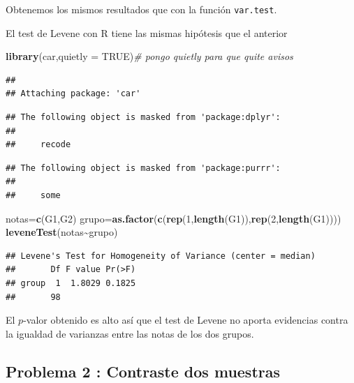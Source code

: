 \documentclass[
]{article}
\newenvironment{Shaded}{\begin{snugshade}}{\end{snugshade}}
\newcommand{\CommentTok}[1]{\textcolor[rgb]{0.56,0.35,0.01}{\textit{#1}}}
\newcommand{\DataTypeTok}[1]{\textcolor[rgb]{0.13,0.29,0.53}{#1}}
\newcommand{\DecValTok}[1]{\textcolor[rgb]{0.00,0.00,0.81}{#1}}
\newcommand{\KeywordTok}[1]{\textcolor[rgb]{0.13,0.29,0.53}{\textbf{#1}}}
\newcommand{\NormalTok}[1]{#1}
\newcommand{\OperatorTok}[1]{\textcolor[rgb]{0.81,0.36,0.00}{\textbf{#1}}}
\newcommand{\OtherTok}[1]{\textcolor[rgb]{0.56,0.35,0.01}{#1}}
\begin{document}
Obtenemos los mismos resultados que con la función \texttt{var.test}.

El test de Levene con R tiene las mismas hipótesis que el anterior

\begin{Shaded}
\begin{Highlighting}[]
\KeywordTok{library}\NormalTok{(car,}\DataTypeTok{quietly =} \OtherTok{TRUE}\NormalTok{)}\CommentTok{\# pongo quietly para que quite avisos}
\end{Highlighting}
\end{Shaded}

\begin{verbatim}
## 
## Attaching package: 'car'
\end{verbatim}

\begin{verbatim}
## The following object is masked from 'package:dplyr':
## 
##     recode
\end{verbatim}

\begin{verbatim}
## The following object is masked from 'package:purrr':
## 
##     some
\end{verbatim}

\begin{Shaded}
\begin{Highlighting}[]
\NormalTok{notas=}\KeywordTok{c}\NormalTok{(G1,G2)}
\NormalTok{grupo=}\KeywordTok{as.factor}\NormalTok{(}\KeywordTok{c}\NormalTok{(}\KeywordTok{rep}\NormalTok{(}\DecValTok{1}\NormalTok{,}\KeywordTok{length}\NormalTok{(G1)),}\KeywordTok{rep}\NormalTok{(}\DecValTok{2}\NormalTok{,}\KeywordTok{length}\NormalTok{(G1))))}
\KeywordTok{leveneTest}\NormalTok{(notas}\OperatorTok{\textasciitilde{}}\NormalTok{grupo)}
\end{Highlighting}
\end{Shaded}

\begin{verbatim}
## Levene's Test for Homogeneity of Variance (center = median)
##       Df F value Pr(>F)
## group  1  1.8029 0.1825
##       98
\end{verbatim}

El \(p\)-valor obtenido es alto así que el test de Levene no aporta
evidencias contra la igualdad de varianzas entre las notas de los dos
grupos.

\hypertarget{problema-2-contraste-dos-muestras}{%
\subsection{Problema 2 : Contraste dos
muestras}\label{problema-2-contraste-dos-muestras}}
\end{document}
